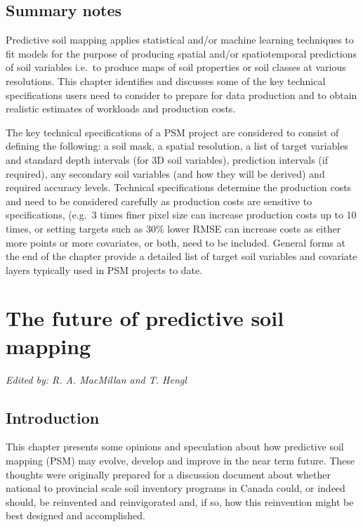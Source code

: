\documentclass[graybox,natbib,nospthms,UStrade]{svmono}
\begin{document}
\hypertarget{summary-notes}{%
\section{Summary notes}\label{summary-notes}}

Predictive soil mapping applies statistical and/or machine learning
techniques to fit models for the purpose of producing spatial and/or
spatiotemporal predictions of soil variables i.e.~to produce maps of
soil properties or soil classes at various resolutions. This chapter
identifies and discusses some of the key technical specifications users need to
consider to prepare for data production and to obtain realistic
estimates of workloads and production costs.

The key technical specifications of a PSM project are considered to consist of defining
the following: a soil mask, a spatial resolution, a list of target
variables and standard depth intervals (for 3D soil variables),
prediction intervals (if required), any secondary soil variables (and
how they will be derived) and required accuracy levels. Technical
specifications determine the production costs and need to be considered
carefully as production costs are sensitive to specifications, (e.g.~3
times finer pixel size can increase production costs up to 10 times, or
setting targets such as 30\% lower RMSE can increase costs as either more
points or more covariates, or both, need to be included. General forms
at the end of the chapter provide a detailed list of target soil
variables and covariate layers typically used in PSM projects to date.

\hypertarget{the-future-of-predictive-soil-mapping}{%
\chapter{The future of predictive soil mapping}\label{the-future-of-predictive-soil-mapping}}

\emph{Edited by: R. A. MacMillan and T. Hengl}

\hypertarget{introduction-3}{%
\section{Introduction}\label{introduction-3}}

This chapter presents some opinions and speculation about how predictive
soil mapping (PSM) may evolve, develop and improve in the near term
future. These thoughts were originally prepared for a discussion document about
whether national to provincial scale soil inventory programs in Canada
could, or indeed should, be reinvented and reinvigorated and, if so, how
this reinvention might be best designed and accomplished.
\end{document}
